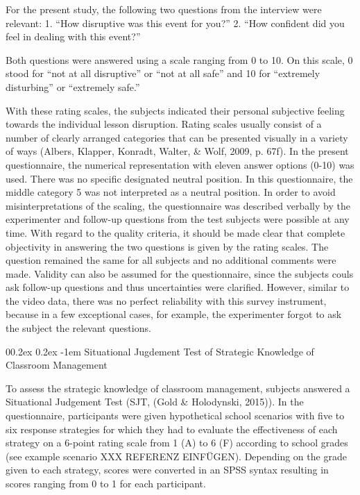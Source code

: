 \documentclass[
  man]{apa6}
\makeatletter
\let\oldparagraph\paragraph
\renewcommand{\paragraph}{
    \@ifstar
      \xxxParagraphStar
      \xxxParagraphNoStar
  }
\newcommand{\xxxParagraphStar}[1]{\oldparagraph*{#1}\mbox{}}
\newcommand{\xxxParagraphNoStar}[1]{\oldparagraph{#1}\mbox{}}
\renewcommand{\paragraph}{\@startsection{paragraph}{4}{\parindent}%
  {0\baselineskip \@plus 0.2ex \@minus 0.2ex}%
  {-1em}%
  {\normalfont\normalsize\bfseries\itshape\typesectitle}}
\makeatother
\begin{document}
For the present study, the following two questions from the interview were relevant:
1. ``How disruptive was this event for you?''
2. ``How confident did you feel in dealing with this event?''

Both questions were answered using a scale ranging from 0 to 10. On this scale, 0 stood for ``not at all disruptive'' or ``not at all safe'' and 10 for ``extremely disturbing'' or ``extremely safe.''

With these rating scales, the subjects indicated their personal subjective feeling towards the individual lesson disruption. Rating scales usually consist of a number of clearly arranged categories that can be presented visually in a variety of ways (Albers, Klapper, Konradt, Walter, \& Wolf, 2009, p. 67f). In the present questionnaire, the numerical representation with eleven answer options (0-10) was used. There was no specific designated neutral position. In this questionnaire, the middle category 5 was not interpreted as a neutral position. In order to avoid misinterpretations of the scaling, the questionnaire was described verbally by the experimenter and follow-up questions from the test subjects were possible at any time. With regard to the quality criteria, it should be made clear that complete objectivity in answering the two questions is given by the rating scales. The question remained the same for all subjects and no additional comments were made. Validity can also be assumed for the questionnaire, since the subjects couls ask follow-up questions and thus uncertainties were clarified. However, similar to the video data, there was no perfect reliability with this survey instrument, because in a few exceptional cases, for example, the experimenter forgot to ask the subject the relevant questions.

\paragraph{Situational Jugdement Test of Strategic Knowledge of Classroom Management}\label{situational-jugdement-test-of-strategic-knowledge-of-classroom-management}

To assess the strategic knowledge of classroom management, subjects answered a Situational Judgement Test (SJT, (Gold \& Holodynski, 2015)). In the questionnaire, participants were given hypothetical school scenarios with five to six response strategies for which they had to evaluate the effectiveness of each strategy on a 6-point rating scale from 1 (A) to 6 (F) according to school grades (see example scenario XXX REFERENZ EINFÜGEN). Depending on the grade given to each strategy, scores were converted in an SPSS syntax resulting in scores ranging from 0 to 1 for each participant.
\end{document}
